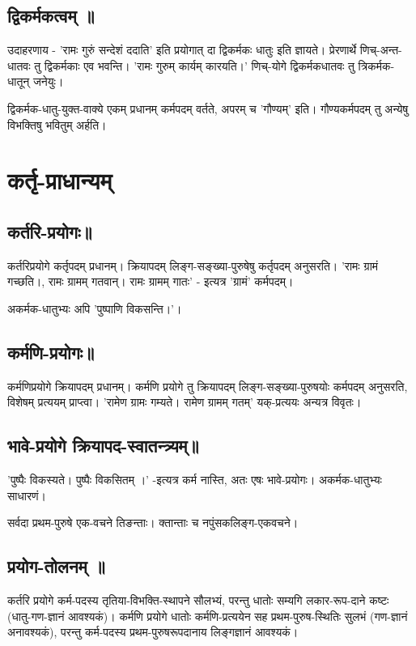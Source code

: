 \documentclass[oneside, article]{memoir}
\begin{document}
\subsection{द्विकर्मकत्वम् ॥}
उदाहरणाय - 'रामः गुरुं सन्देशं ददाति' इति प्रयोगात् दा द्विकर्मकः धातुः इति ज्ञायते। प्रेरणार्थे णिच्-अन्त-धातवः तु द्विकर्मकाः एव भवन्ति। 'रामः गुरुम् कार्यम् कारयति।' णिच्-योगे द्विकर्मकधातवः तु त्रिकर्मक-धातून् जनेयुः।

द्विकर्मक-धातु-युक्त-वाक्ये एकम् प्रधानम् कर्मपदम् वर्तते, अपरम् च 'गौण्यम्' इति। गौण्यकर्मपदम् तु अन्येषु विभक्तिषु भवितुम् अर्हति।

\section{कर्तृ-प्राधान्यम्}
\subsection{कर्तरि-प्रयोगः॥}
कर्तरिप्रयोगे कर्तृपदम् प्रधानम्। क्रियापदम् लिङ्ग-सङ्ख्या-पुरुषेषु कर्तृपदम् अनुसरति। 'रामः ग्रामं गच्छति।, रामः ग्रामम् गतवान्। रामः ग्रामम् गातः' - इत्यत्र 'ग्रामं' कर्मपदम्।

अकर्मक-धातुभ्यः अपि 'पुष्पाणि विकसन्ति।'।

\subsection{कर्मणि-प्रयोगः॥}
कर्मणिप्रयोगे क्रियापदम् प्रधानम्। कर्मणि प्रयोगे तु क्रियापदम् लिङ्ग-सङ्ख्या-पुरुषयोः कर्मपदम् अनुसरति, विशेषम् प्रत्ययम् प्राप्त्वा। 'रामेण ग्रामः गम्यते। रामेण ग्रामम् गतम्' यक्-प्रत्ययः अन्यत्र विवृतः।

\subsection{भावे-प्रयोगे क्रियापद-स्वातन्त्र्यम्॥}
'पुष्पैः विकस्यते। पुष्पैः विकसितम् ।' -इत्यत्र कर्म नास्ति, अतः एषः भावे-प्रयोगः। अकर्मक-धातुभ्यः साधारणं।

सर्वदा प्रथम-पुरुषे एक-वचने तिङन्ताः। क्तान्ताः च नपुंसकलिङ्ग-एकवचने।

\subsection{प्रयोग-तोलनम् ॥}
कर्तरि प्रयोगे कर्म-पदस्य तृतिया-विभक्ति-स्थापने सौलभ्यं, परन्तु धातोः सम्यगि लकार-रूप-दाने कष्टः (धातु-गण-ज्ञानं आवश्यकं)। कर्मणि प्रयोगे धातोः कर्मणि-प्रत्ययेन सह प्रथम-पुरुष-स्थितिः सुलभं (गण-ज्ञानं अनावश्यकं), परन्तु कर्म-पदस्य प्रथम-पुरुषरूपदानाय लिङ्गज्ञानं आवश्यकं।
\end{document}
